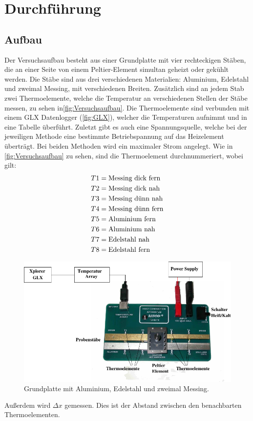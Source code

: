 \section{Durchführung}
\label{sec:Durchführung}


\subsection{Aufbau}
Der Versuchsaufbau besteht aus einer Grundplatte mit vier rechteckigen Stäben, die an einer Seite von einem Peltier-Element simultan geheizt oder gekühlt werden.
Die Stäbe sind aus drei verschiedenen Materialien:  Aluminium, Edelstahl und zweimal Messing, mit verschiedenen Breiten.
Zusätzlich sind an jedem Stab zwei Thermoelemente, welche die Temperatur an verschiedenen Stellen der Stäbe messen, zu sehen in\autoref{fig:Versuchsaufbau}.
Die Thermoelemente sind verbunden mit einem GLX Datenlogger (\autoref{fig:GLX}), welcher die Temperaturen aufnimmt und in eine Tabelle überführt.
Zuletzt gibt es auch eine Spannungsquelle, welche bei der jeweiligen Methode eine bestimmte Betriebspannung auf das Heizelement überträgt. 
Bei beiden Methoden wird ein maximaler Strom angelegt.
Wie in \autoref{fig:Versuchsaufbau} zu sehen, sind die Thermoelement durchnummeriert, wobei gilt:
\begin{align}
    T1 &= \text{Messing dick fern} \notag \\
    T2 &= \text{Messing dick nah} \notag \\
    T3 &= \text{Messing dünn nah} \notag \\
    T4 &= \text{Messing dünn fern} \notag \\
    T5 &= \text{Aluminium fern} \notag \\
    T6 &= \text{Aluminium nah} \notag \\
    T7 &= \text{Edelstahl nah} \notag \\
    T8 &= \text{Edelstahl fern} \notag
\end{align}
\begin{figure}[H]
    \centering
    \includegraphics{content/Abb_1.pdf}
    \caption{Grundplatte mit Aluminium, Edelstahl und zweimal Messing.\cite[3]{V204}}
    \label{fig:Versuchsaufbau}
\end{figure}
\noindent Außerdem wird $\Delta x$ gemessen. Dies ist der Abstand zwischen den benachbarten Thermoelementen.

